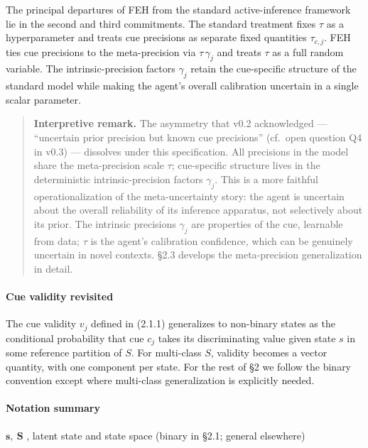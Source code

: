 \documentclass{article}
\begin{document}
The principal departures of FEH from the standard active-inference
framework lie in the second and third commitments. The standard
treatment fixes \(\tau\) as a hyperparameter and treats cue precisions
as separate fixed quantities \(\tau_{c,j}\). FEH ties cue precisions to
the meta-precision via \(\tau\,\gamma_{j}\) and treats \(\tau\) as a
full random variable. The intrinsic-precision factors \(\gamma_{j}\)
retain the cue-specific structure of the standard model while making the
agent's overall calibration uncertain in a single scalar parameter.

\begin{quote}
\textbf{Interpretive remark.} The asymmetry that v0.2 acknowledged ---
``uncertain prior precision but known cue precisions'' (cf.~open
question Q4 in v0.3) --- dissolves under this specification. All
precisions in the model share the meta-precision scale \(\tau\);
cue-specific structure lives in the deterministic intrinsic-precision
factors \(\gamma_{j}\). This is a more faithful operationalization of
the meta-uncertainty story: the agent is uncertain about the overall
reliability of its inference apparatus, not selectively about its prior.
The intrinsic precisions \(\gamma_{j}\) are properties of the cue,
learnable from data; \(\tau\) is the agent's calibration confidence,
which can be genuinely uncertain in novel contexts. \S{}2.3 develops the
meta-precision generalization in detail.
\end{quote}

\paragraph{Cue validity revisited}\label{cue-validity-revisited}

The cue validity \(v_{j}\) defined in (2.1.1) generalizes to non-binary
states as the conditional probability that cue \(c_{j}\) takes its
discriminating value given state \(s\) in some reference partition of
\(S\). For multi-class \(S\), validity becomes a vector quantity, with
one component per state. For the rest of \S{}2 we follow the binary
convention except where multi-class generalization is explicitly needed.

\paragraph{Notation summary}\label{notation-summary}

\(\mathbf{s,\ S}\) , latent state and state space (binary in \S{}2.1;
general elsewhere)
\end{document}
